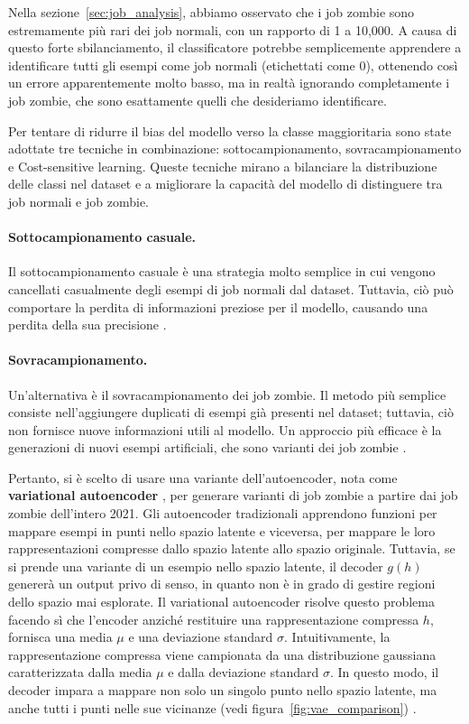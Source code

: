 Nella sezione~\ref{sec:job_analysis}, abbiamo osservato che i job zombie sono
estremamente più rari dei job normali, con un rapporto di 1 a 10,000. A causa
di questo forte sbilanciamento, il classificatore potrebbe semplicemente
apprendere a identificare tutti gli esempi come job normali (etichettati come
0), ottenendo così un errore apparentemente molto basso, ma in realtà
ignorando completamente i job zombie, che sono esattamente quelli che
desideriamo identificare. 

Per tentare di ridurre il bias del modello verso la classe maggioritaria sono
state adottate tre tecniche in combinazione: sottocampionamento,
sovracampionamento e Cost-sensitive learning. Queste tecniche mirano a
bilanciare la distribuzione delle classi nel dataset e a migliorare la
capacità del modello di distinguere tra job normali e job zombie. 

\paragraph{Sottocampionamento casuale.} Il sottocampionamento casuale è una
strategia molto semplice in cui vengono cancellati casualmente degli esempi di
job normali dal dataset. Tuttavia, ciò può comportare la perdita di
informazioni preziose per il modello, causando una perdita della sua
precisione \cite{he2013}.

\paragraph{Sovracampionamento.}
\label{par:vae}

Un'alternativa è il sovracampionamento dei job zombie. Il metodo più semplice
consiste nell'aggiungere duplicati di esempi già presenti nel dataset;
tuttavia, ciò non fornisce nuove informazioni utili al modello. Un approccio
più efficace è la generazioni di nuovi esempi artificiali, che sono varianti
dei job zombie \cite{brownlee2021}. 

Pertanto, si è scelto di usare una variante dell'autoencoder, nota come
\textbf{variational autoencoder} \cite{kingma2022}, per generare varianti di
job zombie a partire dai job zombie dell'intero 2021. Gli autoencoder
tradizionali apprendono funzioni per mappare esempi in punti nello spazio
latente e viceversa, per mappare le loro rappresentazioni compresse dallo
spazio latente allo spazio originale. Tuttavia, se si prende una variante di
un esempio nello spazio latente, il decoder $g(h)$ genererà un output privo di
senso, in quanto non è in grado di gestire regioni dello spazio mai esplorate.
Il variational autoencoder risolve questo problema facendo sì che l'encoder
anziché restituire una rappresentazione compressa $h$, fornisca una media
$\mu$ e una deviazione standard $\sigma$. Intuitivamente, la rappresentazione
compressa viene campionata da una distribuzione gaussiana caratterizzata dalla
media $\mu$ e dalla deviazione standard $\sigma$. In questo modo, il decoder
impara a mappare non solo un singolo punto nello spazio latente, ma anche
tutti i punti nelle sue vicinanze (vedi figura~\ref{fig:vae_comparison})
\cite{shafkat2018}.

